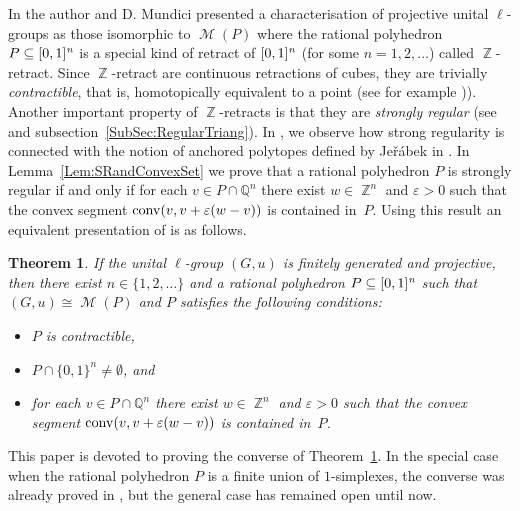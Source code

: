\documentclass[reqno, draft]{amsart}
\newtheorem{theorem}{Theorem}[section]
\theoremstyle{definition}
\begin{document}
In \cite{CM2013} the author and D. Mundici presented a 
characterisation of projective unital $\ell$-groups 
as those isomorphic to  $\operatorname{\mathscr M}(P)$  
where the rational polyhedron $P\subseteq {[0,1]^{\it n}}$ 
is a special kind of retract of ${[0,1]^{\it n}}$ (for some $n=1,2,\ldots$)
called $\operatorname{\mathbb{Z}}$-retract. Since $\operatorname{\mathbb{Z}}$-retract are continuous 
retractions of cubes, they are trivially {\it contractible}, that is,  
homotopically equivalent to a point
 (see for example \cite[Chapter 0]{Hat2001})).
Another important property of $\operatorname{\mathbb{Z}}$-retracts is that they are 
{\it strongly regular} (see \cite[Definition~3.1]{CM2013} and subsection~\ref{SubSec:RegularTriang}). 
In \cite[Theorem~4.17]{Cab201X}, we observe how
strong regularity is connected with the notion of anchored 
polytopes defined by  Je\v{r}\'abek in \cite{Je2010}.
In Lemma~\ref{Lem:SRandConvexSet} we prove that a rational polyhedron $P$ is strongly regular if and only if for each $v\in P\cap {\mathbb{Q}}^n$ there exist $w\in \operatorname{\mathbb{Z}}^n$ and $\varepsilon>0$ such that the convex segment $\operatorname{{\rm conv}}(v,v+\varepsilon (w-v))$ is contained in~$P$.
Using this result an equivalent presentation of \cite[Theorem~4.5]{CM2013} is as follows.

\begin{theorem}
\label{Thm:ToInvert}
If the unital $\ell$-group  $(G,u)$ 
is finitely generated and projective, 
then there exist $n\in\{1,2,\ldots\}$ 
and a rational  polyhedron  $P\subseteq {[0,1]^{\it n}}$ 
such that $(G,u)\cong\operatorname{\mathscr M}(P)$ and $P$ 
satisfies the following conditions:
\begin{itemize}
\item[(i)]
$P$ is contractible,

\item[(ii)] $P\cap\{0,1\}^n\neq\emptyset$, and

\item[(iii)]
for each $v\in P\cap {\mathbb{Q}}^n$ there exist $w\in \operatorname{\mathbb{Z}}^n$ and 
$\varepsilon>0$ such that the convex segment 
$\operatorname{{\rm conv}}(v,v+\varepsilon (w-v))$ is contained in~$P$.
\end{itemize}
  \end{theorem}
  
 

This paper is devoted to proving the converse of 
Theorem~\ref{Thm:ToInvert}. 
In the special case when the rational polyhedron $P$
 is a finite union of $1$-simplexes, 
the converse was already proved in \cite[Corollary~5.4]{CM2013}, 
but the general case has remained open until now. 
\end{document}
